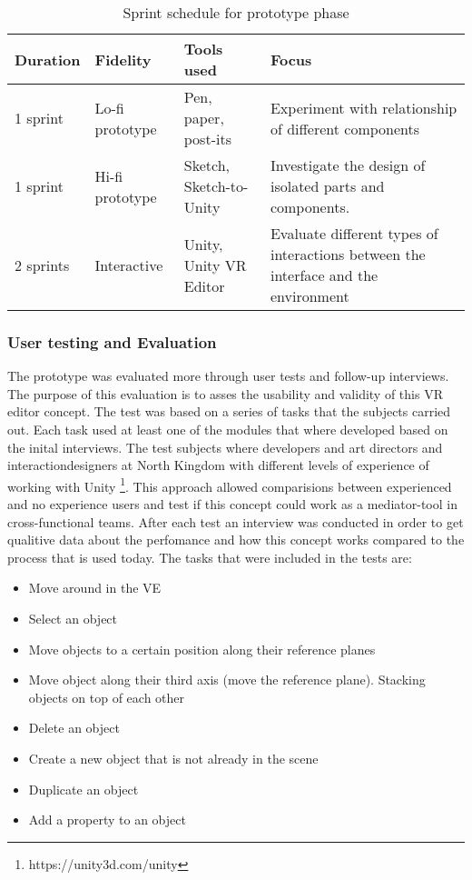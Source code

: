 \begin{table}[]
  \centering
  \caption{Sprint schedule for prototype phase}
  \label{table:sprints}
  \begin{tabular}{|l|l|l| p{5cm}|}
     \hline
    \textbf{Duration} & \textbf{Fidelity} & \textbf{Tools used} & \textbf{Focus} \\\hline
    1 sprint                         & Lo-fi prototype  & Pen, paper, post-its    & Experiment with relationship of different components                               \\\hline
    1 sprint                        & Hi-fi prototype & Sketch, Sketch-to-Unity & Investigate the design of isolated parts and components.                           \\\hline
    2 sprints                 & Interactive   & Unity, Unity VR Editor  & Evaluate different types of interactions between the interface and the environment  \\\hline
  \end{tabular}
\end{table}

\subsubsection{User testing and Evaluation}
The prototype was evaluated more through user tests and follow-up interviews. The purpose of this evaluation is to asses the usability and validity of this VR editor concept. The test was based on a series of tasks that the subjects carried out. Each task used at least one of the modules that where developed based on the inital interviews.
The test subjects where developers and art directors and interactiondesigners at North Kingdom with different levels of experience of working with Unity \footnote{https://unity3d.com/unity}. This approach allowed comparisions between experienced and no experience users and test if this concept could work as a mediator-tool in cross-functional teams. After each test an interview was conducted in order to get qualitive data about the perfomance and how this concept works compared to the process that is used today.
The tasks that were included in the tests are:
\begin{itemize}
  \item Move around in the VE
  \item Select an object
  \item Move objects to a certain position along their reference planes
  \item Move object along their third axis (move the reference plane). Stacking objects on top of each other
  \item Delete an object
  \item Create a new object that is not already in the scene
  \item Duplicate an object
  \item Add a property to an object
\end{itemize}
